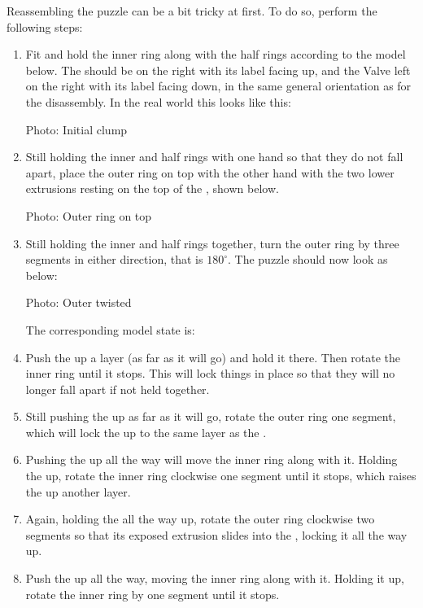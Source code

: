 \documentclass{article}
\newcommand{\photo}[1]{
      \begin{center}
            Photo: #1
      \end{center}
}
\begin{document}
Reassembling the puzzle can be a bit tricky at first.
To do so, perform the following steps:
\begin{enumerate}
      \item Fit and hold the inner ring along with the half rings according to the model below.
            The \hhalf{} should be on the right with its label facing up, and the Valve left on the right with its label facing down, in the same general orientation as for the disassembly.
            In the real world this looks like this:
            \photo{Initial clump}
      \item Still holding the inner and half rings with one hand so that they do not fall apart, place the outer ring on top with the other hand with the two lower extrusions resting on the top of the \vhalf{}, shown below.
            \photo{Outer ring on top}
      \item Still holding the inner and half rings together, turn the outer ring by three segments in either direction, that is $180^\circ$.
            The puzzle should now look as below:
            \photo{Outer twisted}
            The corresponding model state is:
      \item Push the \vhalf{} up a layer (as far as it will go) and hold it there.
            Then rotate the inner ring \cc{} until it stops.
            This will lock things in place so that they will no longer fall apart if not held together.
      \item Still pushing the \vhalf{} up as far as it will go, rotate the outer ring \cc{} one segment, which will lock the \vhalf{} up to the same layer as the \hhalf{}.
      \item Pushing the \hhalf{} up all the way will move the inner ring along with it.
            Holding the \hhalf{} up, rotate the inner ring clockwise one segment until it stops, which raises the \hhalf{} up another layer.
      \item Again, holding the \hhalf{} all the way up, rotate the outer ring clockwise two segments so that its exposed extrusion slides into the \hhalf{}, locking it all the way up.
      \item Push the \vhalf{} up all the way, moving the inner ring along with it.
            Holding it up, rotate the inner ring \cc{} by one segment until it stops.

\end{enumerate}
\end{document}
